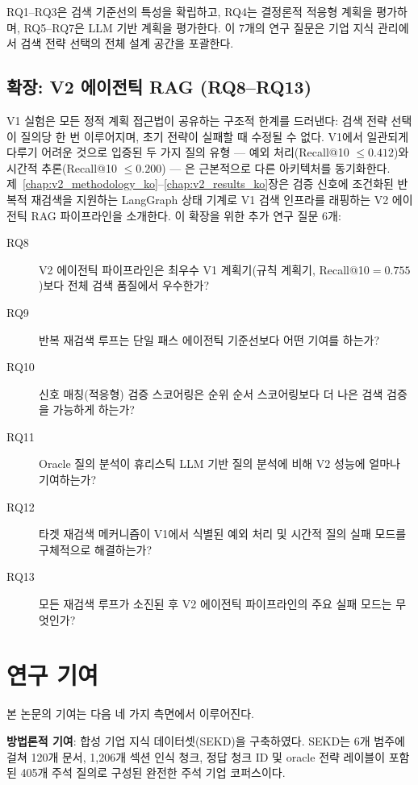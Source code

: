 RQ1--RQ3은 검색 기준선의 특성을 확립하고, RQ4는 결정론적 적응형 계획을 평가하며, RQ5--RQ7은 LLM 기반 계획을 평가한다. 이 7개의 연구 질문은 기업 지식 관리에서 검색 전략 선택의 전체 설계 공간을 포괄한다.

\subsection*{확장: V2 에이전틱 RAG (RQ8--RQ13)}
\label{sec:intro_rqs_v2_ko}

V1 실험은 모든 정적 계획 접근법이 공유하는 구조적 한계를 드러낸다: 검색 전략 선택이 질의당 한 번 이루어지며, 초기 전략이 실패할 때 수정될 수 없다. V1에서 일관되게 다루기 어려운 것으로 입증된 두 가지 질의 유형 — 예외 처리(Recall@10 $\leq 0.412$)와 시간적 추론(Recall@10 $\leq 0.200$) — 은 근본적으로 다른 아키텍처를 동기화한다. 제~\ref{chap:v2_methodology_ko}--\ref{chap:v2_results_ko}장은 검증 신호에 조건화된 반복적 재검색을 지원하는 LangGraph 상태 기계로 V1 검색 인프라를 래핑하는 V2 에이전틱 RAG 파이프라인을 소개한다. 이 확장을 위한 추가 연구 질문 6개:

\begin{description}
    \item[RQ8]  V2 에이전틱 파이프라인은 최우수 V1 계획기(규칙 계획기, Recall@10$={0.755}$)보다 전체 검색 품질에서 우수한가?
    \item[RQ9]  반복 재검색 루프는 단일 패스 에이전틱 기준선보다 어떤 기여를 하는가?
    \item[RQ10] 신호 매칭(적응형) 검증 스코어링은 순위 순서 스코어링보다 더 나은 검색 검증을 가능하게 하는가?
    \item[RQ11] Oracle 질의 분석이 휴리스틱 LLM 기반 질의 분석에 비해 V2 성능에 얼마나 기여하는가?
    \item[RQ12] 타겟 재검색 메커니즘이 V1에서 식별된 예외 처리 및 시간적 질의 실패 모드를 구체적으로 해결하는가?
    \item[RQ13] 모든 재검색 루프가 소진된 후 V2 에이전틱 파이프라인의 주요 실패 모드는 무엇인가?
\end{description}

\section{연구 기여}
\label{sec:intro_contributions_ko}

본 논문의 기여는 다음 네 가지 측면에서 이루어진다.

\textbf{방법론적 기여}: 합성 기업 지식 데이터셋(SEKD)을 구축하였다. SEKD는 6개 범주에 걸쳐 120개 문서, 1,206개 섹션 인식 청크, 정답 청크 ID 및 oracle 전략 레이블이 포함된 405개 주석 질의로 구성된 완전한 주석 기업 코퍼스이다.

